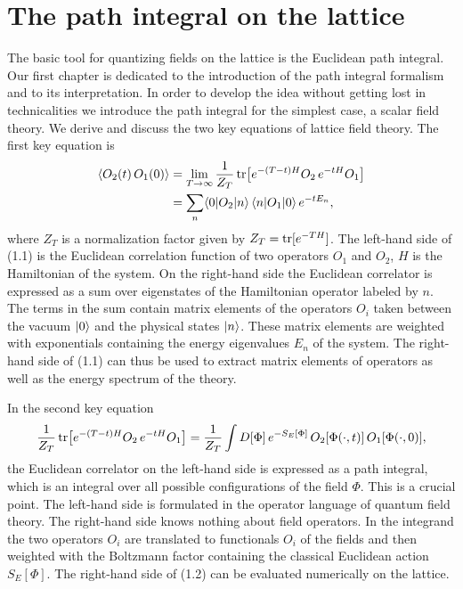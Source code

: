 
\chapter{The path integral on the lattice}

The basic tool for quantizing fields on the lattice is the Euclidean path
integral. Our first chapter is dedicated to the introduction of the path
integral formalism and to its interpretation. In order to develop the idea
without getting lost in technicalities we introduce the path integral for the
simplest case, a scalar field theory. We derive and discuss the two key
equations of lattice field theory. The first key equation is
\begin{equation}
  \begin{split}
    \left\langle O_2(t)\,O_1(0) \right\rangle
    &= \lim_{T\to\infty}\frac{1}{Z_T}\operatorname{tr}\!\big[e^{-(T-t)H}O_2\,e^{-tH}O_1\big]\\
    &= \sum_n \langle0|O_2|n\rangle\,\langle n|O_1|0\rangle\,e^{-tE_n},
  \end{split}
\end{equation}
where $Z_T$ is a normalization factor given by $Z_T = \operatorname{tr}[e^{-TH}]$. The
left-hand side of (1.1) is the Euclidean correlation function of two operators
$O_1$ and $O_2$, $H$ is the Hamiltonian of the system. On the right-hand side
the Euclidean correlator is expressed as a sum over eigenstates of the
Hamiltonian operator labeled by $n$. The terms in the sum contain matrix
elements of the operators $O_i$ taken between the vacuum $|0\rangle$ and the
physical states $|n\rangle$. These matrix elements are weighted with exponentials
containing the energy eigenvalues $E_n$ of the system. The right-hand side of
(1.1) can thus be used to extract matrix elements of operators as well as the
energy spectrum of the theory.

In the second key equation
\begin{equation}
  \frac{1}{Z_T}\operatorname{tr}\!\big[e^{-(T-t)H}O_2\,e^{-tH}O_1\big]
  = \frac{1}{Z_T}\int D[\Phi]\,e^{-S_E[\Phi]}\,O_2[\Phi(\cdot,t)]\,O_1[\Phi(\cdot,0)],
\end{equation}
the Euclidean correlator on the left-hand side is expressed as a path integral,
which is an integral over all possible configurations of the field $\Phi$. This
is a crucial point. The left-hand side is formulated in the operator language
of quantum field theory. The right-hand side knows nothing about field
operators. In the integrand the two operators $O_i$ are translated to
functionals $O_i$ of the fields and then weighted with the Boltzmann factor
containing the classical Euclidean action $S_E[\Phi]$. The right-hand side of
(1.2) can be evaluated numerically on the lattice.

